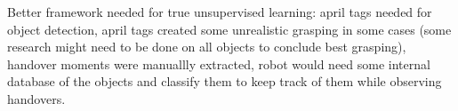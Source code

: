 Better framework needed for true unsupervised learning:
april tags needed for object detection,
april tags created some unrealistic grasping in some cases
(some research might need to be done on all objects to conclude best grasping),
handover moments were manuallly extracted,
robot would need some internal database of the objects and classify them to keep track of them
while observing handovers.




